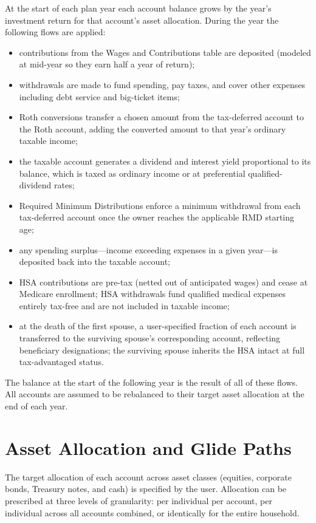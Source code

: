 \documentclass[fleqn,12pt]{report}
\begin{document}
At the start of each plan year each account balance grows by the year's
investment return for that account's asset allocation.
During the year the following flows are applied:
\begin{itemize}[nosep]
  \item contributions from the Wages and Contributions table are deposited
    (modeled at mid-year so they earn half a year of return);
  \item withdrawals are made to fund spending, pay taxes, and cover other
    expenses including debt service and big-ticket items;
  \item Roth conversions transfer a chosen amount from the tax-deferred
    account to the Roth account, adding the converted amount to that
    year's ordinary taxable income;
  \item the taxable account generates a dividend and interest yield
    proportional to its balance, which is taxed as ordinary income or at
    preferential qualified-dividend rates;
  \item Required Minimum Distributions enforce a minimum withdrawal from
    each tax-deferred account once the owner reaches the applicable RMD
    starting age;
  \item any spending surplus---income exceeding expenses in a given
    year---is deposited back into the taxable account;
  \item HSA contributions are pre-tax (netted out of anticipated wages) and
    cease at Medicare enrollment;
    HSA withdrawals fund qualified medical expenses entirely tax-free and
    are not included in taxable income;
  \item at the death of the first spouse, a user-specified fraction
    of each account is transferred to the surviving spouse's
    corresponding account, reflecting beneficiary designations;
    the surviving spouse inherits the HSA intact at full tax-advantaged status.
\end{itemize}

The balance at the start of the following year is the result of all of
these flows.
All accounts are assumed to be rebalanced to their target asset allocation
at the end of each year.

\section{Asset Allocation and Glide Paths}

The target allocation of each account across asset classes (equities,
corporate bonds, Treasury notes, and cash) is specified by the user.
Allocation can be prescribed at three levels of granularity: per individual
per account, per individual across all accounts combined, or identically
for the entire household.
\end{document}
